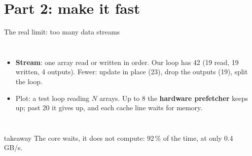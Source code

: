 \documentclass[aspectratio=169,10pt,t]{beamer}
\newcommand{\term}[1]{\textcolor{psblue!85!black}{\textbf{#1}}} %
\newcommand{\takeaway}[1]{\par\vfill
  \begin{beamercolorbox}[wd=\textwidth,sep=4pt,rounded=true]{takeaway}
    \small #1
  \end{beamercolorbox}}
\begin{document}
\section{Part 2: make it fast}

\begin{frame}{The real limit: too many data streams}
  \begin{columns}[T,onlytextwidth]
    \centering
    \vspace{4mm}
    \begin{itemize}\small
      \item \term{Stream}: one array read or written in order. Our loop has 42 (19 read, 19
            written, 4 outputs). Fewer: update in place (23), drop the outputs (19), split the loop.
      \item Plot: a test loop reading $N$ arrays. Up to 8 the \term{hardware prefetcher} keeps up;
            past 20 it gives up, and each cache line waits for memory.
    \end{itemize}
  \end{columns}
  \takeaway{The core waits, it does not compute: 92\,\% of the time, at only 0.4\,GB/s.}
\end{frame}
\end{document}

